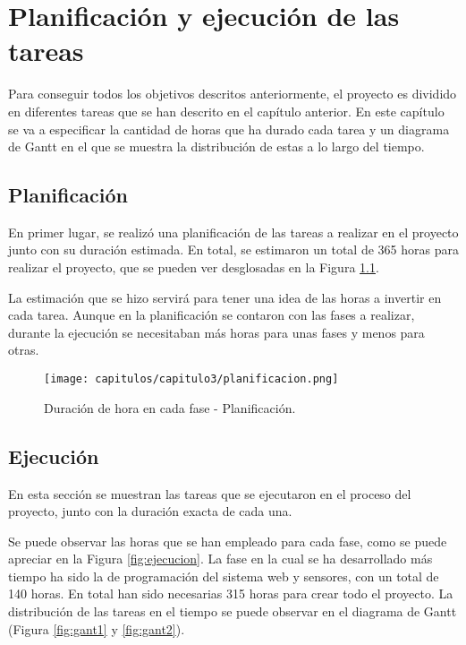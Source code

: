 \chapter{Planificación y ejecución de las tareas}

Para conseguir todos los objetivos descritos anteriormente, el proyecto es dividido en diferentes tareas que se han descrito en el capítulo anterior. En este capítulo se va a especificar la cantidad de horas que ha durado cada tarea y un diagrama de Gantt \cite{nineth} en el que se muestra la distribución de estas a lo largo del tiempo.

\section{Planificación}
En primer lugar, se realizó una planificación de las tareas a realizar en el proyecto junto con su duración estimada. En total, se estimaron un total de 365 horas para realizar el proyecto, que se pueden ver desglosadas en la Figura \ref{fig:planificacion}.

La estimación que se hizo servirá para tener una idea de las horas a invertir en cada tarea. Aunque en la planificación se contaron con las fases a realizar, durante la ejecución se necesitaban más horas para unas fases y menos para otras.

\begin{figure}[h]
    \centering
    \texttt{[image: capitulos/capitulo3/planificacion.png]}
    \caption{Duración de hora en cada fase - Planificación.}
    \label{fig:planificacion}
\end{figure}

\newpage
\fancyhead{}
\fancyfoot{}
\renewcommand{\headrulewidth}{0.5pt}
\fancyhead[LE,RO]{\textsl{\thepage}}
\fancyhead[RE]{\textsl{\nouppercase{\leftmark}}}
\fancyhead[LO]{\textsl{\nombreTFG}}

\section{Ejecución}

En esta sección se muestran las tareas que se ejecutaron en el proceso del proyecto, junto con la duración exacta de cada una.

Se puede observar las horas que se han empleado para cada fase, como se puede apreciar en la Figura \ref{fig:ejecucion}. La fase en la cual se ha desarrollado más tiempo ha sido la de programación del sistema web y sensores, con un total de 140 horas. En total han sido necesarias 315 horas para crear todo el proyecto. La distribución de las tareas en el tiempo se puede observar en el diagrama de Gantt (Figura \ref{fig:gant1} y \ref{fig:gant2}).

